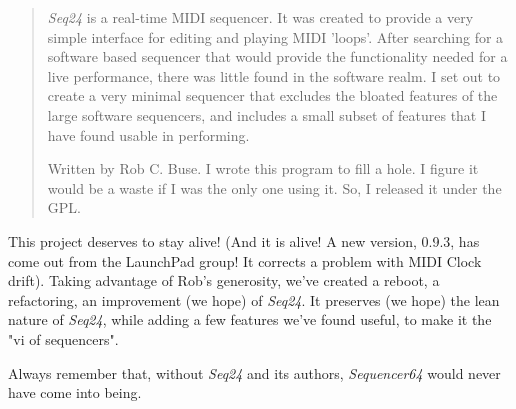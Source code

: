    \begin{quotation}
      \textsl{Seq24} is a real-time MIDI sequencer. It was created to
      provide a very simple interface for editing and playing MIDI 'loops'.
      After searching for a software based sequencer that would provide the
      functionality needed for a live performance, there was little found in
      the software realm. I set out to create a very minimal sequencer that
      excludes the bloated features of the large software sequencers, and
      includes a small subset of features that I have found usable in
      performing. 

      Written by Rob C. Buse.  I wrote this program to fill a
      hole.  I figure it would be a waste if I was the only one
      using it.  So, I released it under the GPL.
   \end{quotation}

   This project deserves to stay alive!
   (And it is alive!  A new version, 0.9.3, has come out from the LaunchPad
   group!  It corrects a problem with MIDI Clock drift).
   Taking advantage of Rob's generosity,
   we've created a reboot, a refactoring, an improvement (we hope) of
   \textsl{Seq24}.  It preserves (we hope) the lean nature of \textsl{Seq24},
   while adding a few features we've found useful, to make it the
    "vi of sequencers".
   
   Always remember that, without \textsl{Seq24} and its authors,
   \textsl{Sequencer64} would never have come into being.

